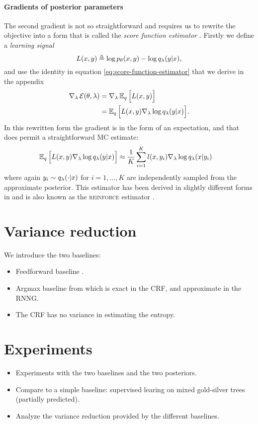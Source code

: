 \paragraph{Gradients of posterior parameters}
The second gradient is not so straightforward and requires us to rewrite the objective into a form that is called the \textit{score function estimator} \citep{Fu2006}. Firstly we define a \textit{learning signal}
\begin{equation}
  L(x, y) \triangleq \log p_{\theta}(x, y) - \log q_{\lambda}(y | x),
\end{equation}
and use the identity in equation \ref{eq:score-function-estimator} that we derive in the appendix
\begin{align*}
  \nabla_{\lambda} \operatorname{\mathcal{E}}(\theta, \lambda)
    &= \nabla_{\lambda} \operatorname{\mathbb{E}}_{q} \Big[ L(x, y) \Big] \\
    &= \operatorname{\mathbb{E}}_{q} \Big[ L(x, y) \nabla_{\lambda} \log q_{\lambda}(y | x) \Big].
\end{align*}
In this rewritten form the gradient is in the form of an expectation, and that does permit a straightforward MC estimate:
\begin{align}
    \operatorname{\mathbb{E}}_{q} \Big[ L(x, y) \nabla_{\lambda} \log q_{\lambda}(y | x) \Big]
        &\approx \frac{1}{K}\sum_{i=1}^K  l(x, y_i)\nabla_{\lambda} \log q_{\lambda}(x | y_i)
\end{align}
where again $y_i \sim q_{\lambda}(\cdot | x)$ for $i=1,\dots,K$ are independently sampled from the approximate posterior. This estimator has been derived in slightly different forms in \citet{Williams1992:REINFORCE,Paisley+2012:VISS,Mnih+2014:NVIL,Ranganath+2014:BBVI,Miao+2016} and is also known as the \textsc{reinforce} estimator \citep{Williams1992:REINFORCE}.


\section{Variance reduction}
We introduce the two baselines:
\begin{itemize}
  \item Feedforward baseline \citep{Miao+2016}.
  \item Argmax baseline from \citet{Rennie+2017:argmax-baseline} which is exact in the CRF, and approximate in the RNNG.
  \item The CRF has no variance in estimating the entropy.
\end{itemize}


\section{Experiments}
\begin{itemize}
  \item Experiments with the two baselines and the two posteriors.
  \item Compare to a simple baseline: supervised learing on mixed gold-silver trees (partially predicted).
  \item Analyze the variance reduction provided by the different baselines.
\end{itemize}


